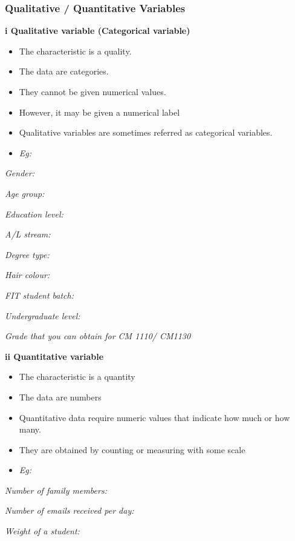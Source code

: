 \documentclass[]{book}
\providecommand{\tightlist}{%
  \setlength{\itemsep}{0pt}\setlength{\parskip}{0pt}}
\begin{document}
\hypertarget{qualitative-quantitative-variables}{%
\subsubsection{Qualitative / Quantitative Variables}\label{qualitative-quantitative-variables}}

\textbf{i Qualitative variable (Categorical variable)}

\begin{itemize}
\tightlist
\item
  The characteristic is a quality.
\item
  The data are categories.
\item
  They cannot be given numerical values.
\item
  However, it may be given a numerical label
\item
  Qualitative variables are sometimes referred as categorical variables.
\item
  \emph{Eg:}
\end{itemize}

\emph{Gender:}

\emph{Age group:}

\emph{Education level:}

\emph{A/L stream:}

\emph{Degree type:}

\emph{Hair colour: }

\emph{FIT student batch:}

\emph{Undergraduate level:}

\emph{Grade that you can obtain for CM 1110/ CM1130}

\textbf{ii Quantitative variable }

\begin{itemize}
\tightlist
\item
  The characteristic is a quantity
\item
  The data are numbers
\item
  Quantitative data require numeric values that indicate how much or how many.
\item
  They are obtained by counting or measuring with some scale
\item
  \emph{Eg: }
\end{itemize}

\emph{Number of family members:}

\emph{Number of emails received per day:}

\emph{Weight of a student:}
\end{document}
